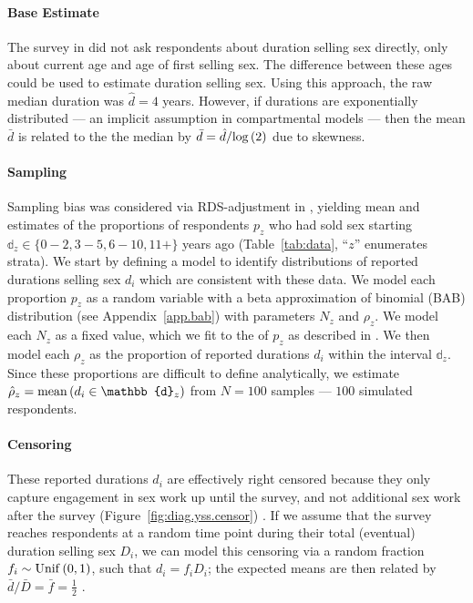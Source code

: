 \paragraph{Base Estimate}
The survey in \cite{Baral2014} did not ask respondents about duration selling sex directly,
only about current age and age of first selling sex.
The difference between these ages could be used to estimate duration selling sex.
Using this approach, the raw median duration was $\hat{d} = 4$ years.
However, if durations are exponentially distributed
--- an implicit assumption in compartmental models \cite{Anderson1991} ---
then the mean $\bar{d}$ is related to the the median by
$\bar{d} = \hat{d}/\mathrm{log}\,(2)$ due to skewness.
\paragraph{Sampling}
Sampling bias was considered via RDS-adjustment in \cite{Baral2014},
yielding mean and \ci estimates of the proportions of respondents $p_z$
who had sold sex starting $\mathbb{d}_z \in \{0{-}2, 3{-}5, 6{-}10, 11+\}$ years ago
(Table~\ref{tab:data}, ``$z$'' enumerates strata).
We start by defining a model to identify
distributions of reported durations selling sex $d_i$
which are consistent with these data.
We model each proportion $p_z$ as a random variable with
a beta approximation of binomial (BAB) distribution (see Appendix~\ref{app.bab})
with parameters $N_z$ and $\rho_z$.
We model each $N_z$ as a fixed value,
which we fit to the \ci of $p_z$ as described in .
We then model each $\rho_z$ as
the proportion of reported durations $d_i$ within the interval $\mathbb{d}_z$.
Since these proportions are difficult to define analytically,
we estimate $\hat{\rho}_z = \distr{mean}{d_i \in \mathbb{d}_z}$
from $N = 100$ samples --- \ie $100$ simulated respondents.
\paragraph{Censoring}
These reported durations $d_i$ are effectively right censored
because they only capture engagement in sex work up until the survey,
and not additional sex work after the survey
(Figure~\ref{fig:diag.yss.censor}) \cite{Fazito2012}.
If we assume that the survey reaches respondents at a random time point
during their total (eventual) duration selling sex $D_i$, we can model this censoring via
a random fraction $f_i \sim \mathrm{Unif}\,(0,1)$, such that $d_i = f_i D_i$;
the expected means are then related by $\bar{d} / \bar{D} = \bar{f} = \frac12$ \cite{Tufto2017}.
